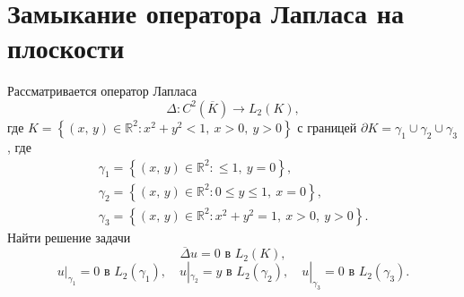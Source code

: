 \documentclass[a4paper]{article}
\begin{document}
\section{Замыкание оператора Лапласа на плоскости}
\begin{hiProb}[№11]
Рассматривается оператор Лапласа
\[
	\Delta \colon  C^2 \left( \overline{K} \right) \to 
	L_2 (K)
,\]
где $K= \left\{ \left( x,\,y \right) \in \mathbb{R}^2 \colon x^2+
y^2 <1,\  x>0,\ y>0\right\} $ с границей $\partial K=\gamma_1 \cup
 \gamma_2 \cup \gamma_3$, где
 \begin{gather*}
	 \gamma_1=\left\{ (x,\,y) \in \mathbb{R}^2\colon \le 1
	 ,\ y=0\right\}, \\
	 \gamma_2= \left\{ (x,\,y) \in \mathbb{R}^2\colon 
	 0\le y\le 1,\ x=0\right\} ,\\
	 \gamma_3 =\left\{ (x,\,y)\in \mathbb{R}^2\colon 
	 x^2+y^2=1,\ x>0,\ y>0\right\} 
 .\end{gather*} 
Найти решение задачи
\[
	\overline{\Delta}u=0 \text{ в } L_2(K),
\]
\[
	\left. u \right|_{\gamma_1}=0 \text{ в } L_2(\gamma_1),\quad
		u|_{\gamma_2}=y \text{ в } L_2(\gamma_2),\quad
		u|_{\gamma_3}=0 \text{ в } L_2(\gamma_3)
.\] 
\end{hiProb}
\end{document}
